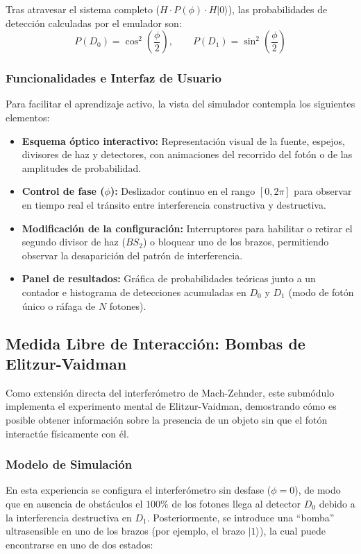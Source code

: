 \documentclass{article}
\begin{document}
Tras atravesar el sistema completo ($H \cdot P(\phi) \cdot H |0\rangle$), las probabilidades de detección calculadas por el emulador son:
\begin{equation}
    P(D_0) = \cos^2\left(\frac{\phi}{2}\right), \qquad P(D_1) = \sin^2\left(\frac{\phi}{2}\right)
\end{equation}

\subsubsection{Funcionalidades e Interfaz de Usuario}
Para facilitar el aprendizaje activo, la vista del simulador contempla los siguientes elementos:
\begin{itemize}
    \item \textbf{Esquema óptico interactivo:} Representación visual de la fuente, espejos, divisores de haz y detectores, con animaciones del recorrido del fotón o de las amplitudes de probabilidad.
    \item \textbf{Control de fase ($\phi$):} Deslizador continuo en el rango $[0, 2\pi]$ para observar en tiempo real el tránsito entre interferencia constructiva y destructiva.
    \item \textbf{Modificación de la configuración:} Interruptores para habilitar o retirar el segundo divisor de haz ($BS_2$) o bloquear uno de los brazos, permitiendo observar la desaparición del patrón de interferencia.
    \item \textbf{Panel de resultados:} Gráfica de probabilidades teóricas junto a un contador e histograma de detecciones acumuladas en $D_0$ y $D_1$ (modo de fotón único o ráfaga de $N$ fotones).
\end{itemize}

\subsection{Medida Libre de Interacción: Bombas de Elitzur-Vaidman}

Como extensión directa del interferómetro de Mach-Zehnder, este submódulo implementa el experimento mental de Elitzur-Vaidman, demostrando cómo es posible obtener información sobre la presencia de un objeto sin que el fotón interactúe físicamente con él.

\subsubsection{Modelo de Simulación}
En esta experiencia se configura el interferómetro sin desfase ($\phi = 0$), de modo que en ausencia de obstáculos el $100\%$ de los fotones llega al detector $D_0$ debido a la interferencia destructiva en $D_1$. Posteriormente, se introduce una ``bomba'' ultrasensible en uno de los brazos (por ejemplo, el brazo $|1\rangle$), la cual puede encontrarse en uno de dos estados:
\end{document}
